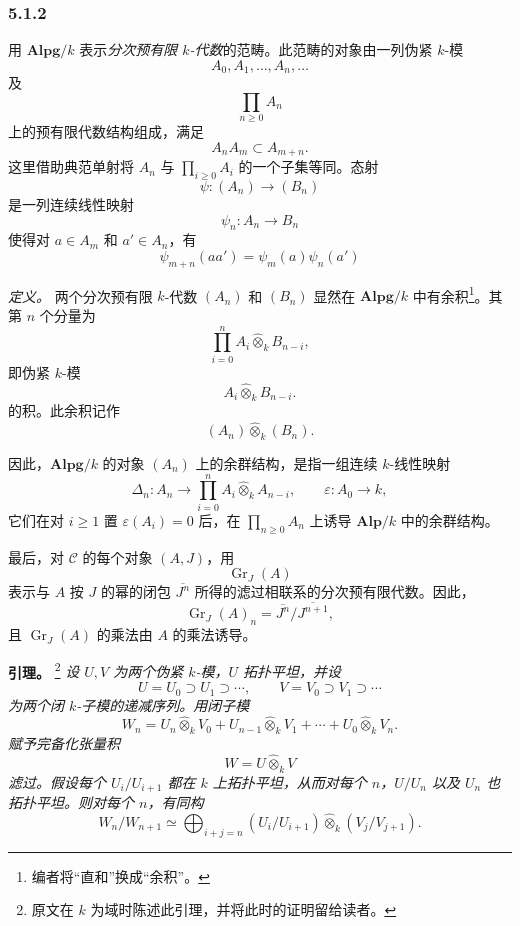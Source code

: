 
\subsubsection*{5.1.2}
\label{sga3:VIIB:5.1.2}

用 \(\mathbf{Alpg}/k\) 表示\emph{分次预有限 \(k\)-代数}的范畴。此范畴的对象由一列伪紧 \(k\)-模
\[
  A_0,A_1,\ldots,A_n,\ldots
\]
及
\[
  \prod_{n\geq0}A_n
\]
上的预有限代数结构组成，满足
\[
  A_nA_m\subset A_{m+n}.
\]
这里借助典范单射将 \(A_n\) 与 \(\prod_{i\geq0}A_i\) 的一个子集等同。态射
\[
  \psi:(A_n)\longrightarrow(B_n)
\]
是一列连续线性映射
\[
  \psi_n:A_n\longrightarrow B_n
\]
使得对 \(a\in A_m\) 和 \(a'\in A_n\)，有
\[
  \psi_{m+n}(aa')=\psi_m(a)\psi_n(a')
\]

\medskip
\noindent\textit{定义。}
两个分次预有限 \(k\)-代数 \((A_n)\) 和 \((B_n)\) 显然在 \(\mathbf{Alpg}/k\) 中有余积\footnote{%
\label{sga3:VIIB:nde:146}编者将“直和”换成“余积”。}。其第 \(n\) 个分量为
\[
  \prod_{i=0}^{n}
  A_i\widehat\otimes_k B_{n-i},
\]
即伪紧 \(k\)-模
\[
  A_i\widehat\otimes_k B_{n-i}.
\]
的积。此余积记作
\[
  (A_n)\widehat\otimes_k(B_n).
\]

因此，\(\mathbf{Alpg}/k\) 的对象 \((A_n)\) 上的余群结构，是指一组连续 \(k\)-线性映射
\[
  \Delta_n:A_n\longrightarrow
  \prod_{i=0}^{n}A_i\widehat\otimes_k A_{n-i},
  \qquad
  \varepsilon:A_0\longrightarrow k,
\]
它们在对 \(i\geq1\) 置 \(\varepsilon(A_i)=0\) 后，在 \(\prod_{n\geq0}A_n\) 上诱导 \(\mathbf{Alp}/k\) 中的余群结构。

最后，对 \(\mathcal C\) 的每个对象 \((A,J)\)，用
\[
  \operatorname{Gr}_J(A)
\]
表示与 \(A\) 按 \(J\) 的幂的闭包 \(\overline{J^n}\) 所得的滤过相联系的分次预有限代数。因此，
\[
  \operatorname{Gr}_J(A)_n
  =
  \overline{J^n}/\overline{J^{n+1}},
\]
且 \(\operatorname{Gr}_J(A)\) 的乘法由 \(A\) 的乘法诱导。

\medskip
\noindent\textbf{引理。}
\label{sga3:VIIB:5.1.2:filtration-lemma}
\footnote{\label{sga3:VIIB:nde:147}原文在 \(k\) 为域时陈述此引理，并将此时的证明留给读者。}
{\itshape 设 \(U,V\) 为两个伪紧 \(k\)-模，\(U\) 拓扑平坦，并设
\[
  U=U_0\supset U_1\supset\cdots,
  \qquad
  V=V_0\supset V_1\supset\cdots
\]
为两个闭 \(k\)-子模的递减序列。用闭子模
\[
  W_n
  =
  U_n\widehat\otimes_kV_0
  +
  U_{n-1}\widehat\otimes_kV_1
  +\cdots+
  U_0\widehat\otimes_kV_n.
\]
赋予完备化张量积
\[
  W=U\widehat\otimes_kV
\]
滤过。假设每个 \(U_i/U_{i+1}\) 都在 \(k\) 上拓扑平坦，从而对每个 \(n\)，\(U/U_n\) 以及 \(U_n\) 也拓扑平坦。则对每个 \(n\)，有同构
\[
  W_n/W_{n+1}
  \simeq
  \bigoplus_{i+j=n}
  (U_i/U_{i+1})\widehat\otimes_k(V_j/V_{j+1}).
\]}
